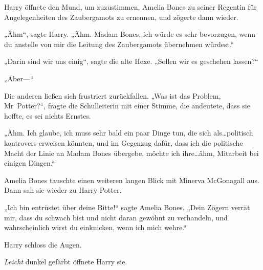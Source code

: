 Harry öffnete den Mund, um zuzustimmen, Amelia Bones zu seiner Regentin für Angelegenheiten des Zaubergamots zu ernennen, und zögerte dann wieder.

„Ähm“, sagte Harry. „Ähm. Madam Bones, ich würde es sehr bevorzugen, wenn du anstelle von mir die Leitung des Zaubergamots übernehmen würdest.“

„Darin sind wir uns einig“, sagte die alte Hexe. „Sollen wir es geschehen lassen?“

„Aber—“

Die anderen ließen sich frustriert zurückfallen.
„Was ist das Problem, Mr~Potter?“, fragte die Schulleiterin mit einer Stimme, die andeutete, dass sie hoffte, es sei nichts Ernstes.

„Ähm. Ich glaube, ich muss sehr bald ein paar Dinge tun, die sich als…politisch kontrovers erweisen könnten, und im Gegenzug dafür, dass ich die politische Macht der Linie an Madam Bones übergebe, möchte ich ihre…ähm, Mitarbeit bei einigen Dingen.“

Amelia Bones tauschte einen weiteren langen Blick mit Minerva McGonagall aus.
Dann sah sie wieder zu Harry Potter.

„Ich bin entrüstet über deine Bitte!“ sagte Amelia Bones. „Dein Zögern verrät mir, dass du schwach bist und nicht daran gewöhnt zu verhandeln, und wahrscheinlich wirst du einknicken, wenn ich mich wehre.“

Harry schloss die Augen.

\emph{Leicht} dunkel gefärbt öffnete Harry sie.

